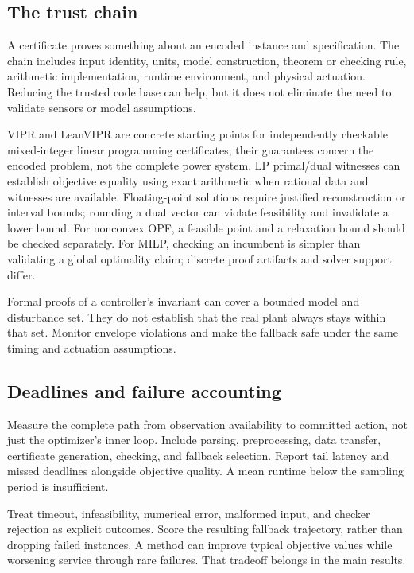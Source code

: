 \documentclass[11pt,letterpaper]{article}
\begin{document}
\subsection{The trust chain}
A certificate proves something about an encoded instance and specification. The chain includes input identity, units, model construction, theorem or checking rule, arithmetic implementation, runtime environment, and physical actuation. Reducing the trusted code base can help, but it does not eliminate the need to validate sensors or model assumptions.

VIPR and LeanVIPR are concrete starting points for independently checkable mixed-integer linear programming certificates; their guarantees concern the encoded problem, not the complete power system.\cite{vipr,leanvipr} LP primal/dual witnesses can establish objective equality using exact arithmetic when rational data and witnesses are available. Floating-point solutions require justified reconstruction or interval bounds; rounding a dual vector can violate feasibility and invalidate a lower bound. For nonconvex OPF, a feasible point and a relaxation bound should be checked separately. For MILP, checking an incumbent is simpler than validating a global optimality claim; discrete proof artifacts and solver support differ.

Formal proofs of a controller's invariant can cover a bounded model and disturbance set. They do not establish that the real plant always stays within that set. Monitor envelope violations and make the fallback safe under the same timing and actuation assumptions.

\subsection{Deadlines and failure accounting}
Measure the complete path from observation availability to committed action, not just the optimizer's inner loop. Include parsing, preprocessing, data transfer, certificate generation, checking, and fallback selection. Report tail latency and missed deadlines alongside objective quality. A mean runtime below the sampling period is insufficient.

Treat timeout, infeasibility, numerical error, malformed input, and checker rejection as explicit outcomes. Score the resulting fallback trajectory, rather than dropping failed instances. A method can improve typical objective values while worsening service through rare failures. That tradeoff belongs in the main results.
\end{document}
